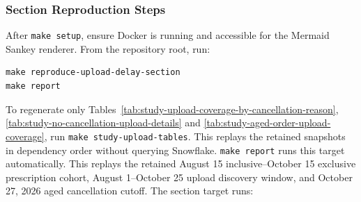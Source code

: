 \clearpage
\subsubsection{Section Reproduction Steps}\label{subsubsec:reproduce-upload-delays}
After \texttt{make setup}, ensure Docker is running and accessible for the
Mermaid Sankey renderer. From the repository root, run:
\begin{lstlisting}[basicstyle=\ttfamily\small,breaklines=true]
make reproduce-upload-delay-section
make report
\end{lstlisting}
To regenerate only Tables~\ref{tab:study-upload-coverage-by-cancellation-reason},
\ref{tab:study-no-cancellation-upload-details} and
\ref{tab:study-aged-order-upload-coverage}, run
\texttt{make study-upload-tables}. This replays the retained snapshots in dependency
order without querying Snowflake. \texttt{make report} runs this target automatically.
This replays the retained August 15 inclusive--October 15 exclusive prescription
cohort, August 1--October 25 upload discovery window, and October 27, 2026 aged
cancellation cutoff. The section target runs:

